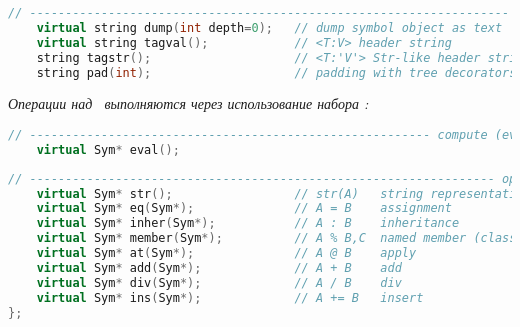 \begin{lstlisting}[language=C++,title=вывод дампа объекта в текстовом формате]
// ------------------------------------------------------------------- dumping
	virtual string dump(int depth=0);	// dump symbol object as text
	virtual string tagval();			// <T:V> header string
	string tagstr();					// <T:'V'> Str-like header string
	string pad(int);					// padding with tree decorators
\end{lstlisting}

\emph{Операции над \ выполняются через использование
набора :}

\begin{lstlisting}[language=C++,title=вычисление объекта]
// -------------------------------------------------------- compute (evaluate)
	virtual Sym* eval();
\end{lstlisting}

\begin{lstlisting}[language=C++,title=операторы]
// ----------------------------------------------------------------- operators
	virtual Sym* str();					// str(A)	string representation
	virtual Sym* eq(Sym*);				// A = B	assignment
	virtual Sym* inher(Sym*);			// A : B	inheritance
	virtual Sym* member(Sym*);			// A % B,C	named member (class slot)
	virtual Sym* at(Sym*);				// A @ B	apply
	virtual Sym* add(Sym*);				// A + B	add
	virtual Sym* div(Sym*);				// A / B	div
	virtual Sym* ins(Sym*);				// A += B	insert
};
\end{lstlisting}
